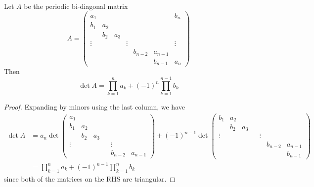 \documentclass[thesis.tex]{subfiles}
\begin{document}
\begin{lemma}\label{bidiag}
Let $A$ be the periodic bi-diagonal matrix
\begin{equation}
A = \begin{pmatrix}
a_1 & & & & & & b_n \\
b_1 & a_2 \\
& b_2 & a_3 \\
\vdots & & & \vdots & &&  \vdots \\
& & & & b_{n-2} & a_{n-1} \\
& & & & & b_{n-1} & a_n
\end{pmatrix}
\end{equation}
Then 
\begin{equation}
\det{A} = \prod_{k = 1}^n a_k + (-1)^n \prod_{k = 1}^{n-1} b_k
\end{equation}

\begin{proof}
Expanding by minors using the last column, we have
\begin{align*}
\det A &= a_n \det
\begin{pmatrix}
a_1 \\
b_1 & a_2 \\
& b_2 & a_3 \\
\vdots & & & & \vdots \\
& & & & b_{n-2} & a_{n-1}
\end{pmatrix}
+ (-1)^{n-1} \det
\begin{pmatrix}
b_1 & a_2 \\
& b_2 & a_3 \\
\vdots & & & & \vdots \\
& & & & & b_{n-2} & a_{n-1} \\
& & & & & & b_{n-1}
\end{pmatrix} \\
&= \prod_{k = 1}^n a_k + (-1)^{n-1} \prod_{k = 1}^n b_k
\end{align*}
since both of the matrices on the RHS are triangular.
\end{proof}
\end{lemma}
\end{document}
